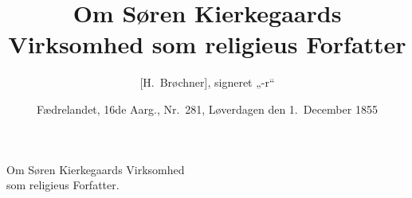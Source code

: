 \documentclass[12pt,a4paper]{book}
\title{\textbf{Om Søren Kierkegaards Virksomhed som religieus Forfatter}}
\author{[H.\ Brøchner], signeret „-r“}
\date{Fædrelandet, 16de Aarg., Nr.\ 281, Løverdagen den 1.\ December 1855}
\newcommand{\opage}[1]{\marginnote{\footnotesize\textit{[#1]}}}
\begin{document}
\maketitle
\thispagestyle{empty}

\opage{1179}

%
%

\begin{center}
{\large Om Søren Kierkegaards Virksomhed\\
som religieus Forfatter.}
\end{center}
\end{document}
